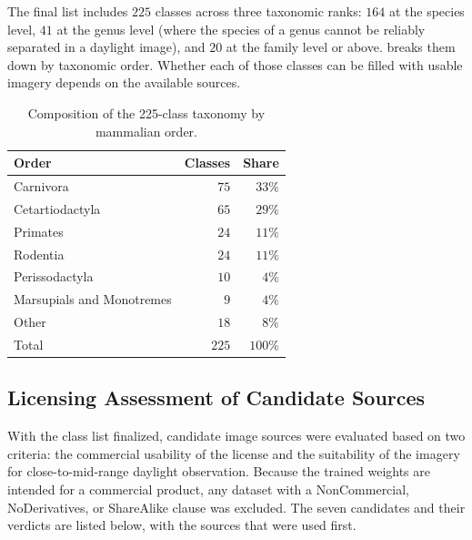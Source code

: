 The final list includes $225$ classes across three taxonomic ranks: $164$ at the species level, $41$ at the genus level (where the species of a genus cannot be reliably separated in a daylight image), and $20$ at the family level or above.  breaks them down by taxonomic order. Whether each of those classes can be filled with usable imagery depends on the available sources.

\begin{table}[htbp]
\centering
\caption{Composition of the 225-class taxonomy by mammalian order.}
\label{tab:class-taxonomy-orders}
\begin{tabular}{@{}lrr@{}}
\toprule
Order & Classes & Share \\
\midrule
Carnivora & $75$ & $33\%$ \\
Cetartiodactyla & $65$ & $29\%$ \\
Primates & $24$ & $11\%$ \\
Rodentia & $24$ & $11\%$ \\
Perissodactyla & $10$ & $4\%$ \\
Marsupials and Monotremes & $9$ & $4\%$ \\
Other & $18$ & $8\%$ \\
\midrule
Total & $225$ & $100\%$ \\
\bottomrule
\end{tabular}
\end{table}

\subsection{Licensing Assessment of Candidate Sources}\label{sec:candidate_sources_licensing}

With the class list finalized, candidate image sources were evaluated based on two criteria: the commercial usability of the license and the suitability of the imagery for close-to-mid-range daylight observation. Because the trained weights are intended for a commercial product, any dataset with a NonCommercial, NoDerivatives, or ShareAlike clause was excluded. The seven candidates and their verdicts are listed below, with the sources that were used first.

